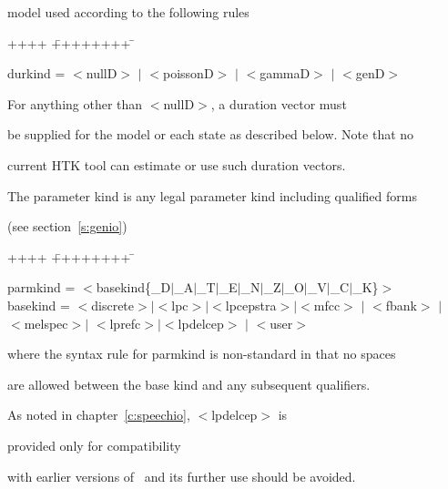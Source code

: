 model used according to the following rules


{\sf


\begin{tabbing}


++++ \= ++++++++ \=  \kill


\>  durkind =\> $<$nullD$>$ $|$ $<$poissonD$>$ $|$ $<$gammaD$>$ $|$ $<$genD$>$ 


\end{tabbing}


}


\noindent


For anything other than {\sf $<$nullD$>$}, a duration vector must


be supplied for the model or each state as described below. Note that no


current HTK tool can estimate or use such duration vectors.  





The parameter kind is any legal parameter kind including qualified forms


(see section~\ref{s:genio})


{\sf


\begin{tabbing}


++++ \= ++++++++ \=  \kill


\>  parmkind =\> $<$basekind\{\_D$|$\_A$|$\_T$|$\_E$|$\_N$|$\_Z$|$\_O$|$\_V$|$\_C$|$\_K\}$>$ \\


\>  basekind =\> $<$discrete$>$$|$$<$lpc$>$$|$$<$lpcepstra$>$$|$$<$mfcc$>$ $|$ $<$fbank$>$ $|$ \\


 \> \>          $<$melspec$>$$|$ $<$lprefc$>$$|$$<$lpdelcep$>$ $|$ $<$user$>$ 


\end{tabbing}


}


\noindent


where the syntax rule for {\sf parmkind} is non-standard in that no spaces


are allowed between the base kind and any subsequent qualifiers.


As noted in chapter~\ref{c:speechio}, {\sf $<$lpdelcep$>$} is 


provided only for compatibility


with earlier versions of \HTK\ and its further use should be avoided.






